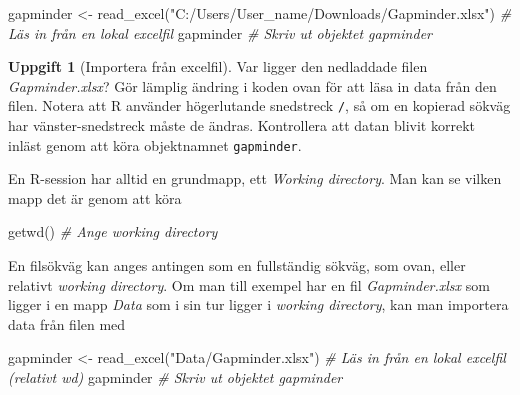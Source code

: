 \documentclass[
]{book}
\newenvironment{Shaded}{\begin{snugshade}}{\end{snugshade}}
\newcommand{\CommentTok}[1]{\textcolor[rgb]{0.56,0.35,0.01}{\textit{#1}}}
\newcommand{\FunctionTok}[1]{\textcolor[rgb]{0.00,0.00,0.00}{#1}}
\newcommand{\NormalTok}[1]{#1}
\newcommand{\OtherTok}[1]{\textcolor[rgb]{0.56,0.35,0.01}{#1}}
\newcommand{\StringTok}[1]{\textcolor[rgb]{0.31,0.60,0.02}{#1}}
\theoremstyle{definition}
\theoremstyle{definition}
\theoremstyle{definition}
\newtheorem{exercise}{Uppgift}[chapter]
\theoremstyle{definition}
\theoremstyle{remark}
\begin{document}
\begin{Shaded}
\begin{Highlighting}[]
\NormalTok{gapminder }\OtherTok{\textless{}{-}} \FunctionTok{read\_excel}\NormalTok{(}\StringTok{"C:/Users/User\_name/Downloads/Gapminder.xlsx"}\NormalTok{)    }\CommentTok{\# Läs in från en lokal excelfil}
\NormalTok{gapminder                                                                 }\CommentTok{\# Skriv ut objektet gapminder}
\end{Highlighting}
\end{Shaded}

\begin{exercise}[Importera från excelfil]
Var ligger den nedladdade filen \emph{Gapminder.xlsx}? Gör lämplig ändring i koden ovan för att läsa in data från den filen. Notera att R använder högerlutande snedstreck \texttt{/}, så om en kopierad sökväg har vänster-snedstreck måste de ändras. Kontrollera att datan blivit korrekt inläst genom att köra objektnamnet \texttt{gapminder}.
\end{exercise}

En R-session har alltid en grundmapp, ett \emph{Working directory}. Man kan se vilken mapp det är genom att köra

\begin{Shaded}
\begin{Highlighting}[]
\FunctionTok{getwd}\NormalTok{()                                }\CommentTok{\# Ange working directory}
\end{Highlighting}
\end{Shaded}

En filsökväg kan anges antingen som en fullständig sökväg, som ovan, eller relativt \emph{working directory}. Om man till exempel har en fil \emph{Gapminder.xlsx} som ligger i en mapp \emph{Data} som i sin tur ligger i \emph{working directory}, kan man importera data från filen med

\begin{Shaded}
\begin{Highlighting}[]
\NormalTok{gapminder }\OtherTok{\textless{}{-}} \FunctionTok{read\_excel}\NormalTok{(}\StringTok{"Data/Gapminder.xlsx"}\NormalTok{)             }\CommentTok{\# Läs in från en lokal excelfil (relativt wd)}
\NormalTok{gapminder                                                  }\CommentTok{\# Skriv ut objektet gapminder}
\end{Highlighting}
\end{Shaded}
\end{document}
